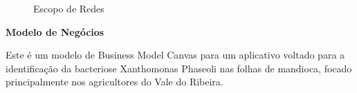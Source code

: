     \begin{figure}[H]
        \centering
        \caption{Escopo de Redes}%
        \label{phot:pg-10}
    \end{figure}

    \textbf{Modelo de Negócios}
    
    Este é um modelo de Business Model Canvas para um aplicativo voltado para a identificação da bacteriose Xanthomonas Phaseoli nas folhas de mandioca, focado principalmente nos agricultores do Vale do Ribeira. 


